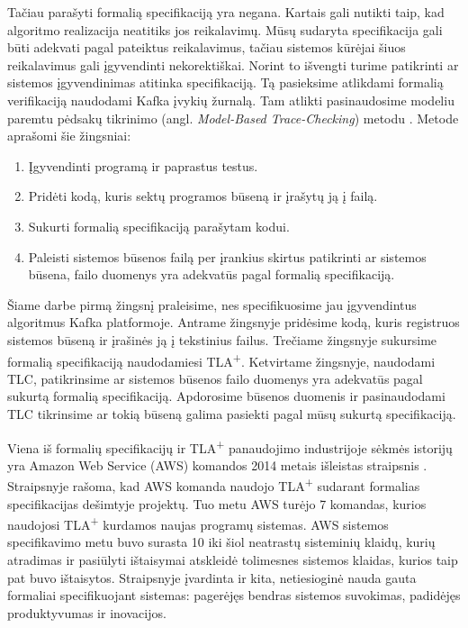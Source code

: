 \documentclass{VUMIFPSmagistrinis}
\begin{document}
		Tačiau parašyti formalią specifikaciją yra negana.
		Kartais gali nutikti taip, kad algoritmo realizacija neatitiks jos reikalavimų.
		Mūsų sudaryta specifikacija gali būti adekvati pagal pateiktus reikalavimus, tačiau sistemos kūrėjai šiuos reikalavimus gali įgyvendinti nekorektiškai.
		Norint to išvengti turime patikrinti ar sistemos įgyvendinimas atitinka specifikaciją.
		Tą pasieksime atlikdami formalią verifikaciją naudodami Kafka įvykių žurnalą.
		Tam atlikti pasinaudosime modeliu paremtu pėdsakų tikrinimo (angl. {\it Model-Based Trace-Checking}) metodu \cite{ltx}.
		Metode aprašomi šie žingsniai:
		\begin{enumerate}
			\item{Įgyvendinti programą ir paprastus testus.}
			\item{Pridėti kodą, kuris sektų programos būseną ir įrašytų ją į failą.}
			\item{Sukurti formalią specifikaciją parašytam kodui.}
			\item{Paleisti sistemos būsenos failą per įrankius skirtus patikrinti ar sistemos būsena, failo duomenys yra adekvatūs pagal formalią specifikaciją.}
		\end{enumerate}

		Šiame darbe pirmą žingsnį praleisime, nes specifikuosime jau įgyvendintus algoritmus Kafka platformoje.
		Antrame žingsnyje pridėsime kodą, kuris registruos sistemos būseną ir įrašinės ją į tekstinius failus.
		Trečiame žingsnyje sukursime formalią specifikaciją naudodamiesi TLA\textsuperscript{+}.
		Ketvirtame žingsnyje, naudodami TLC, patikrinsime ar sistemos būsenos failo duomenys yra adekvatūs pagal sukurtą formalią specifikaciją. Apdorosime būsenos duomenis ir pasinaudodami TLC tikrinsime ar tokią būseną galima pasiekti pagal mūsų sukurtą specifikaciją.


		Viena iš formalių specifikacijų ir TLA\textsuperscript{+} panaudojimo industrijoje sėkmės istorijų yra Amazon Web Service (AWS) komandos 2014 metais išleistas straipsnis \cite{newcombe2014use}.
		Straipsnyje rašoma,  kad AWS komanda naudojo TLA\textsuperscript{+} sudarant formalias specifikacijas dešimtyje projektų. Tuo metu AWS turėjo 7 komandas, kurios naudojosi TLA\textsuperscript{+} kurdamos naujas programų sistemas.
		AWS sistemos specifikavimo metu buvo surasta 10 iki šiol neatrastų sisteminių klaidų, kurių atradimas ir pasiūlyti ištaisymai atskleidė tolimesnes sistemos klaidas, kurios taip pat buvo ištaisytos.
		Straipsnyje įvardinta ir kita, netiesioginė nauda gauta formaliai specifikuojant sistemas: pagerėjęs bendras sistemos suvokimas, padidėjęs produktyvumas ir inovacijos.
		
\end{document}
